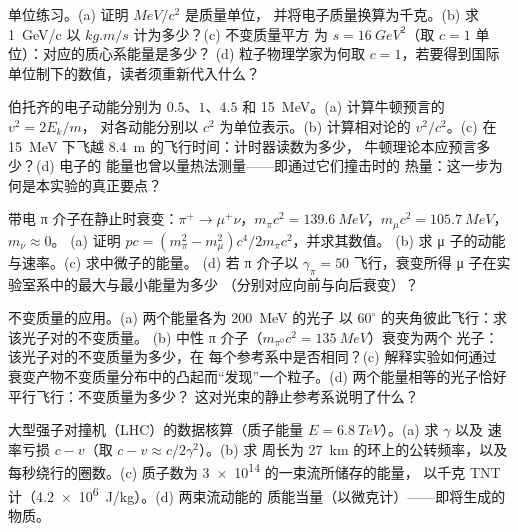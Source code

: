 \begin{exercise}[$\star$]\label{exo:b3:relativistic-dynamics:4}
单位练习。(a) 证明 $\unit{MeV}/c^2$ 是质量单位，
并将电子质量换算为千克。(b) 求
\qty{1}{GeV/c} 以 $\unit{kg.m/s}$ 计为多少？(c) 不变质量平方
为 $s = \qty{16}{GeV^2}$（取 $c = 1$ 单位）：对应的质心系能量是多少？
(d) 粒子物理学家为何取
$c = 1$，若要得到国际单位制下的数值，读者须重新代入什么？
\end{exercise}

\begin{exercise}[$\star\star$]\label{exo:b3:relativistic-dynamics:5}
伯托齐的电子动能分别为 $0.5$、$1$、$4.5$ 和
\qty{15}{MeV}。(a) 计算牛顿预言的 $v^2 = 2E_k/m$，
对各动能分别以 $c^2$ 为单位表示。(b) 计算相对论的 $v^2/c^2$。(c)
在 \qty{15}{MeV} 下飞越 \qty{8.4}{m} 的飞行时间：计时器读数为多少，
牛顿理论本应预言多少？(d) 电子的
能量也曾以量热法测量——即通过它们撞击时的
热量：这一步为何是本实验的真正要点？
\end{exercise}

\begin{exercise}[$\star\star$]\label{exo:b3:relativistic-dynamics:6}
带电 π 介子在静止时衰变：$\pi^+ \to \mu^+\nu$，$m_\pi c^2 =
\qty{139.6}{MeV}$，$m_\mu c^2 = \qty{105.7}{MeV}$，$m_\nu \approx 0$。
(a) 证明 $pc = (m_\pi^2 - m_\mu^2)c^4/2m_\pi c^2$，并求其数值。
(b) 求 μ 子的动能与速率。(c) 求中微子的能量。
(d) 若 π 介子以 $\gamma_\pi = 50$ 飞行，衰变所得 μ 子在实验室系中的最大与最小能量为多少
（分别对应向前与向后衰变）？
\end{exercise}

\begin{exercise}[$\star\star$]\label{exo:b3:relativistic-dynamics:7}
不变质量的应用。(a) 两个能量各为 \qty{200}{MeV} 的光子
以 $60^\circ$ 的夹角彼此飞行：求该光子对的不变质量。
(b) 中性 π 介子（$m_{\pi^0}c^2 = \qty{135}{MeV}$）衰变为两个
光子：该光子对的不变质量为多少，在
每个参考系中是否相同？(c) 解释实验如何通过
衰变产物不变质量分布中的凸起而“发现”一个粒子。(d)
两个能量相等的光子恰好平行飞行：不变质量为多少？
这对光束的静止参考系说明了什么？
\end{exercise}

\begin{exercise}[$\star\star$]\label{exo:b3:relativistic-dynamics:8}
大型强子对撞机（LHC）的数据核算（质子能量 $E = \qty{6.8}{TeV}$）。(a) 求 $\gamma$ 以及
速率亏损 $c - v$（取 $c - v \approx c/2\gamma^2$）。(b) 求
周长为 \qty{27}{km} 的环上的公转频率，以及
每秒绕行的圈数。(c) 质子数为 \num{3e14} 的一束流所储存的能量，
以千克 TNT 计（\qty{4.2e6}{J/kg}）。(d) 两束流动能的
质能当量（以微克计）——即将生成的物质。
\end{exercise}


